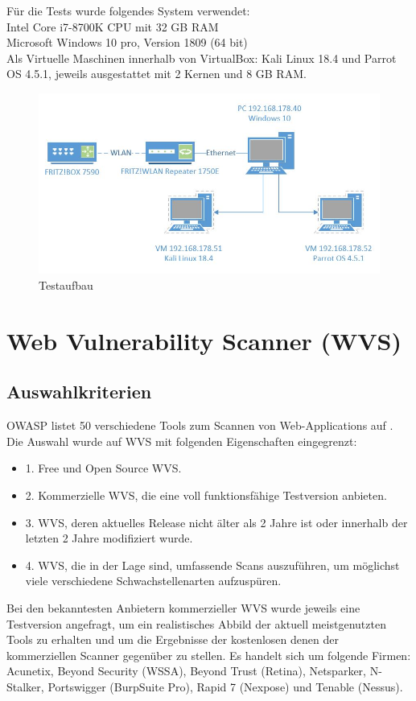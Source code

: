 \documentclass[12pt,oneside,a4paper,parskip]{scrbook}
\begin{document}
  Für die Tests wurde folgendes System verwendet:
  \\Intel Core i7-8700K CPU mit 32 GB RAM
  \\Microsoft Windows 10 pro, Version 1809 (64 bit)
  \\Als Virtuelle Maschinen innerhalb von VirtualBox: Kali Linux 18.4 und Parrot OS 4.5.1, jeweils ausgestattet mit 2 Kernen und 8 GB RAM.
  \begin{figure}[H]
    \includegraphics[width=1\textwidth]{Images/Visio}
    \caption[Testaufbau]{Testaufbau}
  \end{figure}
\section{Web Vulnerability Scanner (WVS)}
  \subsection{Auswahlkriterien}
  OWASP listet 50 verschiedene Tools zum Scannen von Web-Applications auf
  \cite{OWASPtools}. Die Auswahl wurde auf WVS mit folgenden Eigenschaften eingegrenzt:
  \begin{itemize}
    \item 1. Free und Open Source WVS.
    \item 2. Kommerzielle WVS, die eine voll funktionsfähige Testversion anbieten.
    \item 3. WVS, deren aktuelles Release nicht älter als 2 Jahre ist oder innerhalb der letzten 2 Jahre modifiziert wurde.
    \item 4. WVS, die in der Lage sind, umfassende Scans auszuführen, um möglichst viele verschiedene Schwachstellenarten aufzuspüren.
  \end{itemize}
  Bei den bekanntesten Anbietern kommerzieller WVS wurde jeweils eine Testversion angefragt, um ein realistisches Abbild der aktuell meistgenutzten Tools zu erhalten und um die Ergebnisse der kostenlosen denen der kommerziellen Scanner gegenüber zu stellen. Es handelt sich um folgende Firmen:
  \\Acunetix, Beyond Security (WSSA), Beyond Trust (Retina), Netsparker, N-Stalker, Portswigger (BurpSuite Pro), Rapid 7 (Nexpose) und Tenable (Nessus).
\end{document}
